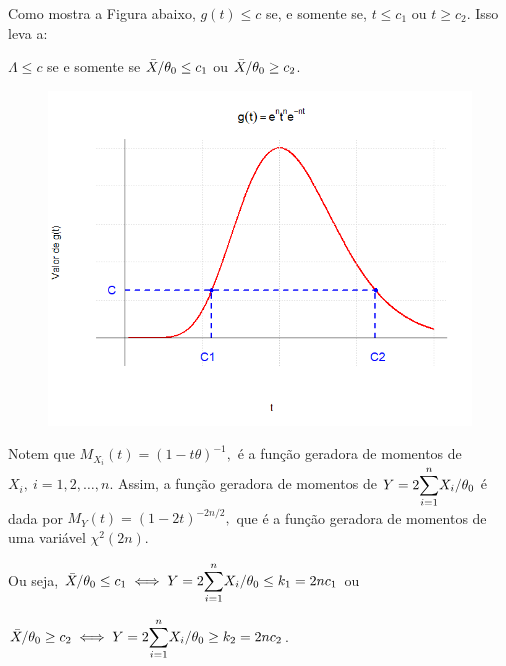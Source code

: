 \documentclass[12pt]{beamer}
\begin{document}
\begin{frame}{}
\begin{block}{}
\justifying
Como mostra a Figura abaixo, $g(t) \leq c$ se, e somente se, $t \leq c_1$ ou $t \geq c_2$. Isso leva a:

$\Lambda \leq c$ se e somente se $\Bar{X}/\theta_0 \leq c_1$ ou $\Bar{X}/\theta_0 \geq c_2$.
\end{block}
\begin{block}{}
\begin{figure}
    \centering
    \includegraphics[scale=0.4]{figs/g_t.png}
    \label{fig:enter-label}
\end{figure}

\end{block}
\end{frame}

\begin{frame}{}
\begin{block}{}
\justifying
Notem que $M_{X_{i}}(t)=(1-t\theta)^{-1},$ é a função geradora de momentos de $X_{i},~i=1,2,\ldots,n.$ Assim, a função geradora de momentos de $Y=2{\displaystyle \sum_{i=1}^{n}} X_{i}/\theta_0$ é dada por $M_{Y}(t)=(1-2t)^{-2n/2},$ que é a função geradora de momentos de uma variável $\chi^{2}(2n).$
\end{block}
\pause
\begin{block}{}
\justifying
Ou seja, $\Bar{X}/\theta_0 \leq c_1\iff Y=2{\displaystyle \sum_{i=1}^{n}} X_{i}/\theta_0\leq k_{1}=2nc_{1}$ ou 
\end{block}
\pause
\begin{block}{}
\justifying
$\Bar{X}/\theta_0 \geq c_2\iff Y=2{\displaystyle \sum_{i=1}^{n}} X_{i}/\theta_0\geq k_{2}=2nc_{2}$.
\end{block}
\end{frame}
\end{document}
